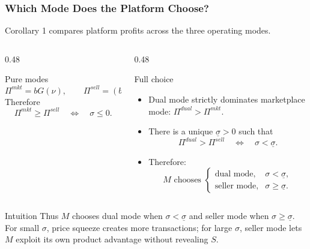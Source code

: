 \begin{frame}
  \frametitle{Which Mode Does the Platform Choose?}
  \footnotesize
  Corollary 1 compares platform profits across the three operating modes.

  \begin{columns}[T,onlytextwidth]
    \begin{column}{0.48\textwidth}
      \begin{block}{Pure modes}
        \[
          \Pi^{mkt}=bG(\nu),
          \qquad
          \Pi^{sell}=(b+\sigma)G(\nu).
        \]
        Therefore
        \[
          \Pi^{mkt}\geq\Pi^{sell}
          \quad\Longleftrightarrow\quad
          \sigma\leq0.
        \]
      \end{block}
    \end{column}

    \begin{column}{0.48\textwidth}
      \begin{block}{Full choice}
        \begin{itemize}
          \item Dual mode strictly dominates marketplace mode:
            $\Pi^{dual}>\Pi^{mkt}$.
          \item There is a unique $\underline{\sigma}>0$ such that
            \[
              \Pi^{dual}>\Pi^{sell}
              \quad\Longleftrightarrow\quad
              \sigma<\underline{\sigma}.
            \]
          \item Therefore:
            \[
              M \text{ chooses }
              \begin{cases}
                \text{dual mode}, & \sigma<\underline{\sigma},\\
                \text{seller mode}, & \sigma\geq\underline{\sigma}.
              \end{cases}
            \]
        \end{itemize}
      \end{block}
    \end{column}
  \end{columns}

  \begin{alertblock}{Intuition}
    Thus $M$ chooses dual mode when $\sigma<\underline{\sigma}$ and seller
    mode when $\sigma\geq\underline{\sigma}$. For small $\sigma$, price
    squeeze creates more transactions; for large $\sigma$, seller mode lets
    $M$ exploit its own product advantage without revealing $S$.
  \end{alertblock}
\end{frame}

